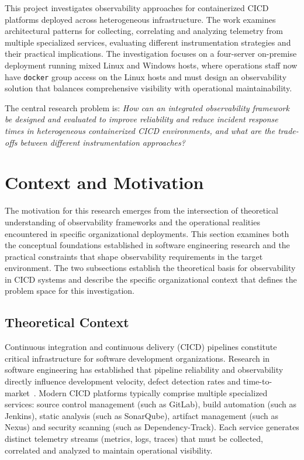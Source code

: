 This project investigates observability approaches for containerized \ac{CICD} platforms deployed across heterogeneous infrastructure. The work examines architectural patterns for collecting, correlating and analyzing telemetry from multiple specialized services, evaluating different instrumentation strategies and their practical implications. The investigation focuses on a four-server on-premise deployment running mixed Linux and Windows hosts, where operations staff now have \texttt{docker} group access on the Linux hosts and must design an observability solution that balances comprehensive visibility with operational maintainability.

The central research problem is: \textit{How can an integrated observability framework be designed and evaluated to improve reliability and reduce incident response times in heterogeneous containerized \ac{CICD} environments, and what are the trade-offs between different instrumentation approaches?}


\section{Context and Motivation}

The motivation for this research emerges from the intersection of theoretical understanding of observability frameworks and the operational realities encountered in specific organizational deployments. This section examines both the conceptual foundations established in software engineering research and the practical constraints that shape observability requirements in the target environment. The two subsections establish the theoretical basis for observability in \ac{CICD} systems and describe the specific organizational context that defines the problem space for this investigation.

\subsection{Theoretical Context}
Continuous integration and continuous delivery (\ac{CICD}) pipelines constitute critical infrastructure for software development organizations. Research in software engineering has established that pipeline reliability and observability directly influence development velocity, defect detection rates and time-to-market~\cite{forsgren2024dora}. Modern \ac{CICD} platforms typically comprise multiple specialized services: source control management (such as GitLab), build automation (such as Jenkins), static analysis (such as SonarQube), artifact management (such as Nexus) and security scanning (such as Dependency-Track). Each service generates distinct telemetry streams (metrics, logs, traces) that must be collected, correlated and analyzed to maintain operational visibility.

